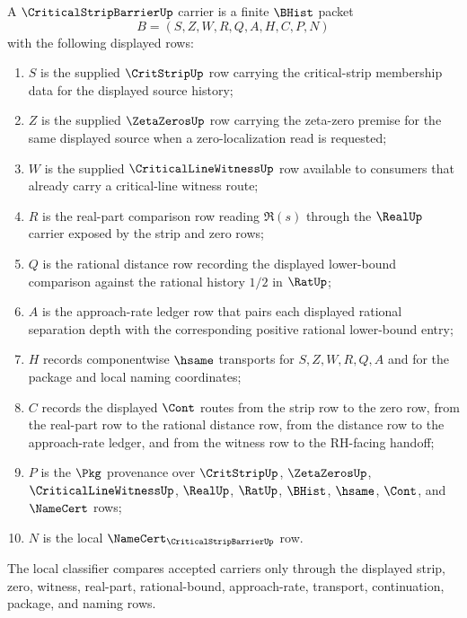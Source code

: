 \begin{definition}
\label{def:critical-strip-barrier-carrier}
A $\CriticalStripBarrierUp$ carrier is a finite $\BHist$ packet
$$
B=(S,Z,W,R,Q,A,H,C,P,N)
$$
with the following displayed rows:
\begin{enumerate}
\item $S$ is the supplied $\CritStripUp$ row carrying the critical-strip membership data for the displayed source history;
\item $Z$ is the supplied $\ZetaZerosUp$ row carrying the zeta-zero premise for the same displayed source when a zero-localization read is requested;
\item $W$ is the supplied $\CriticalLineWitnessUp$ row available to consumers that already carry a critical-line witness route;
\item $R$ is the real-part comparison row reading $\Re(s)$ through the $\RealUp$ carrier exposed by the strip and zero rows;
\item $Q$ is the rational distance row recording the displayed lower-bound comparison against the rational history $1/2$ in $\RatUp$;
\item $A$ is the approach-rate ledger row that pairs each displayed rational separation depth with the corresponding positive rational lower-bound entry;
\item $H$ records componentwise $\hsame$ transports for $S,Z,W,R,Q,A$ and for the package and local naming coordinates;
\item $C$ records the displayed $\Cont$ routes from the strip row to the zero row, from the real-part row to the rational distance row, from the distance row to the approach-rate ledger, and from the witness row to the RH-facing handoff;
\item $P$ is the $\Pkg$ provenance over $\CritStripUp$, $\ZetaZerosUp$, $\CriticalLineWitnessUp$, $\RealUp$, $\RatUp$, $\BHist$, $\hsame$, $\Cont$, and $\NameCert$ rows;
\item $N$ is the local $\NameCert_{\CriticalStripBarrierUp}$ row.
\end{enumerate}
The local classifier compares accepted carriers only through the displayed strip, zero, witness, real-part, rational-bound, approach-rate, transport, continuation, package, and naming rows.
\end{definition}

